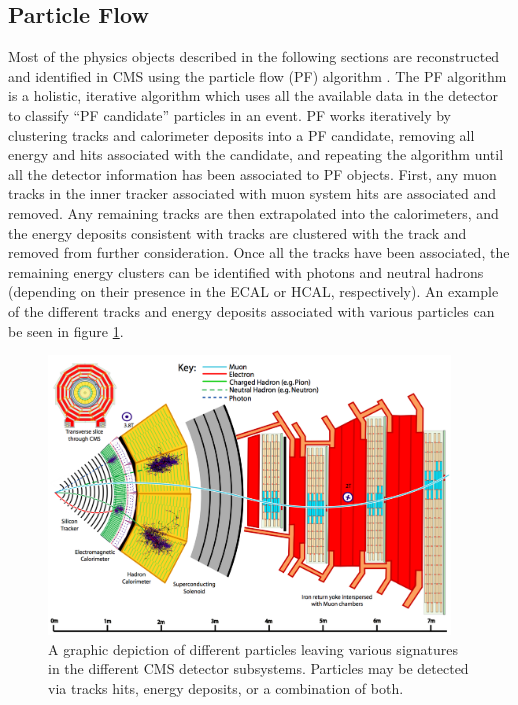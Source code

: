 \subsection{Particle Flow}
\label{subsec:pf}
Most of the physics objects described in the following sections are reconstructed and identified in CMS using the particle flow (PF) algorithm \cite{Sirunyan:2017ulk}. The PF algorithm is a holistic, iterative algorithm which uses all the available data in the detector to classify ``PF candidate'' particles in an event. PF works iteratively by clustering tracks and calorimeter deposits into a PF candidate, removing all energy and hits associated with the candidate, and repeating the algorithm until all the detector information has been associated to PF objects. First, any muon tracks in the inner tracker associated with muon system hits are associated and removed. Any remaining tracks are then extrapolated into the calorimeters, and the energy deposits consistent with tracks are clustered with the track and removed from further consideration. Once all the tracks have been associated, the remaining energy clusters can be identified with photons and neutral hadrons (depending on their presence in the ECAL or HCAL, respectively). An example of the different tracks and energy deposits associated with various particles can be seen in figure \ref{fig:pfCandidates}.
\begin{figure}
	\centering
	\includegraphics[width=0.95\textwidth]{detector/figs/CMS_Slice_2}
	\renewcommand{\baselinestretch}{1.0}
	\caption[A graphic depiction of different particles leaving various signatures in the different CMS detector subsystems.]{A graphic depiction of different particles leaving various signatures in the different CMS detector subsystems. Particles may be detected via tracks hits, energy deposits, or a combination of both.}
	\label{fig:pfCandidates}
\end{figure}

